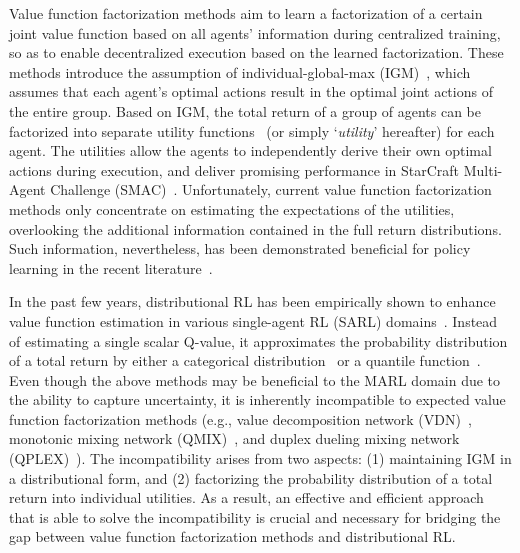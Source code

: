 \documentclass[twoside,11pt]{article}
\begin{document}
Value function factorization methods aim to learn a factorization of a certain joint value function based on all agents' information during centralized training, so as to enable decentralized execution based on the learned factorization.
These methods introduce the assumption of individual-global-max (IGM)~\citep{Son2019QTRAN}, which assumes that each agent's optimal actions result in the optimal joint actions of the entire group.
Based on IGM, the total return of a group of agents can be factorized into separate utility functions~\citep{Guestrin2001Utility} (or simply `\textit{utility}' hereafter) for each agent. The utilities allow the agents to independently derive their own optimal actions during execution, and deliver promising performance in StarCraft Multi-Agent Challenge (SMAC)~\citep{Samvelyan2019SMAC}. Unfortunately, current value function factorization methods only concentrate on estimating the expectations of the utilities, overlooking the additional information contained in the full return distributions. Such information, nevertheless, has been demonstrated beneficial for policy learning in the recent literature~\citep{Lyle2019Comparative}.



In the past few years, distributional RL has been empirically shown to enhance value function estimation in various single-agent RL (SARL) domains~\citep{Bellemare2017C51,Dabney2018QR-DQN,Dabney2018IQN,Rowland2019ER-DQN,Yang2019FQF}. Instead of estimating a single scalar Q-value, it approximates the probability distribution of a total return by either a categorical distribution~\citep{Bellemare2017C51} or a quantile function~\citep{Dabney2018QR-DQN,Dabney2018IQN}. Even though the above methods may be beneficial to the MARL domain due to the ability to capture uncertainty, it is inherently incompatible to expected value function factorization methods (e.g., value decomposition network (VDN)~\citep{Sunehag2018VDN}, monotonic mixing network (QMIX)~\citep{Rashid2018QMIX}, and duplex dueling mixing network (QPLEX)~\citep{Wang2020QPLEX}). The incompatibility arises from two aspects: (1) maintaining IGM in a distributional form, and (2) factorizing the probability distribution of a total return into individual utilities. As a result, an effective and efficient approach that is able to solve the incompatibility is crucial and necessary for bridging the gap between value function factorization methods and distributional RL.
\end{document}
